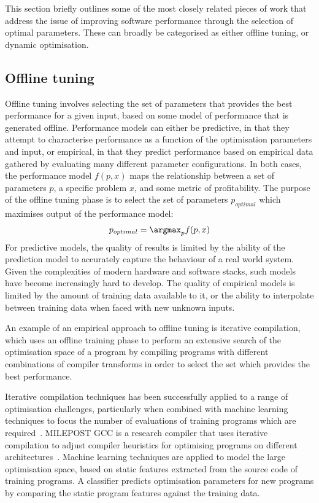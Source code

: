 This section briefly outlines some of the most closely related pieces
of work that address the issue of improving software performance
through the selection of optimal parameters. These can broadly be
categorised as either offline tuning, or dynamic optimisation.

\subsection{Offline tuning}\label{subsec:offline-tuning}
Offline tuning involves selecting the set of parameters that provides
the best performance for a given input, based on some model of
performance that is generated offline. Performance models can either
be predictive, in that they attempt to characterise performance as a
function of the optimisation parameters and input, or empirical, in
that they predict performance based on empirical data gathered by
evaluating many different parameter configurations. In both cases, the
performance model $f(p,x)$ maps the relationship between a set of
parameters $p$, a specific problem $x$, and some metric of
profitability. The purpose of the offline tuning phase is to select
the set of parameters $p_{optimal}$ which maximises output of the
performance model:
\begin{align*}
  p_{optimal} = \argmax_{p}f(p,x)
\end{align*}
For predictive models, the quality of results is limited by the
ability of the prediction model to accurately capture the behaviour of
a real world system. Given the complexities of modern hardware and
software stacks, such models have become increasingly hard to develop.
The quality of empirical models is limited by the amount of training
data available to it, or the ability to interpolate between training
data when faced with new unknown inputs.

An example of an empirical approach to offline tuning is iterative
compilation, which uses an offline training phase to perform an
extensive search of the optimisation space of a program by compiling
programs with different combinations of compiler transforms in order
to select the set which provides the best performance.

Iterative compilation techniques has been successfully applied to a
range of optimisation challenges, particularly when combined with
machine learning techniques to focus the number of evaluations of
training programs which are required~\cite{Agakov}. MILEPOST GCC is a
research compiler that uses iterative compilation to adjust compiler
heuristics for optimising programs on different
architectures~\cite{Fursin2008}. Machine learning techniques are
applied to model the large optimisation space, based on static
features extracted from the source code of training programs. A
classifier predicts optimisation parameters for new programs by
comparing the static program features against the training data.

